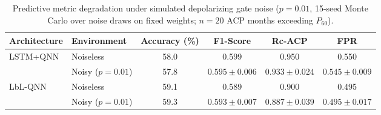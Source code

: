 \begin{table}[htbp]
\centering
\caption{Predictive metric degradation under simulated depolarizing gate noise ($p = 0.01$, 15-seed Monte Carlo over noise draws on fixed weights; $n=20$ ACP months exceeding $P_{60}$).}
\label{tab:noise_degradation}
\begin{tabular}{l l c c c c}
\toprule
\textbf{Architecture} & \textbf{Environment} & \textbf{Accuracy (\%)} & \textbf{F1-Score} & \textbf{Rc-ACP} & \textbf{FPR} \\
\midrule
\multirow{2}{*}{LSTM+QNN} & Noiseless & 58.0 & 0.599 & 0.950 & 0.550 \\
 & Noisy ($p=0.01$) & 57.8 & $0.595 \pm 0.006$ & $0.933 \pm 0.024$ & $0.545 \pm 0.009$ \\
\midrule
\multirow{2}{*}{LbL-QNN} & Noiseless & 59.1 & 0.589 & 0.900 & 0.495 \\
 & Noisy ($p=0.01$) & 59.3 & $0.593 \pm 0.007$ & $0.887 \pm 0.039$ & $0.495 \pm 0.017$ \\
\bottomrule
\end{tabular}
\end{table}